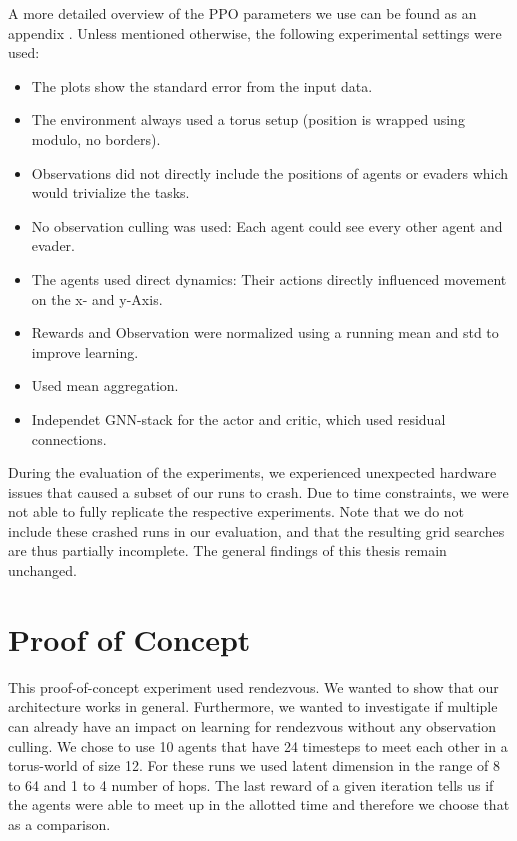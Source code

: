 A more detailed overview of the PPO parameters we use can be found as an appendix . Unless mentioned otherwise, the following experimental settings were used:
\begin{itemize}[noitemsep,nolistsep]
    \item The plots show the standard error from the input data.
    \item The environment always used a torus setup (position is wrapped using modulo, no borders).
    \item Observations did not directly include the positions of agents or evaders which would trivialize the tasks.
    \item No observation culling was used: Each agent could see every other agent and evader.
    \item The agents used direct dynamics: Their actions directly influenced movement on the x- and y-Axis.
    \item Rewards and Observation were normalized using a running mean and std to improve learning.
    \item Used mean aggregation.
    \item Independet GNN-stack for the actor and critic, which used residual connections.
\end{itemize} \par

During the evaluation of the experiments, we experienced unexpected hardware issues that caused a subset of our runs to crash. Due to time constraints, we were not able to fully replicate the respective experiments. Note that we do not include these crashed runs in our evaluation, and that the resulting grid searches are thus partially incomplete. The general findings of this thesis remain unchanged. \par



\section{Proof of Concept}
\label{sec:Proof of Concept}
This proof-of-concept experiment used rendezvous. We wanted to show that our architecture works in general. Furthermore, we wanted to investigate if multiple can already have an impact on learning for rendezvous without any observation culling. We chose to use 10 agents that have 24 timesteps to meet each other in a torus-world of size 12. For these runs we used latent dimension in the range of 8 to 64 and 1 to 4 number of hops. The last reward of a given iteration tells us if the agents were able to meet up in the allotted time and therefore we choose that as a comparison.

